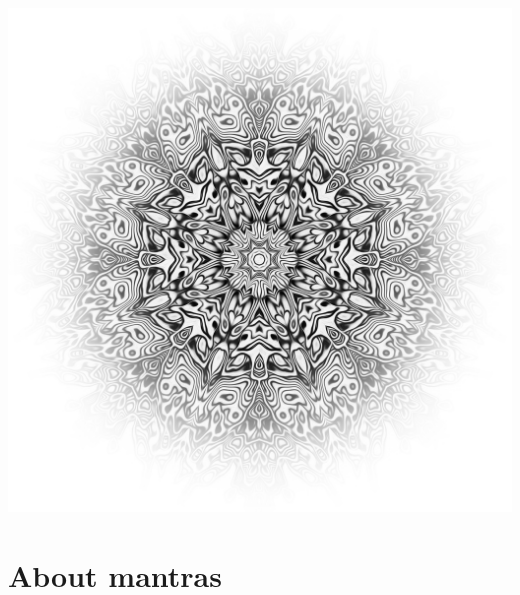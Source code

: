 \documentclass[twoside,10pt]{book}
\begin{document}
  \tableofcontents


  \begin{center}%
    \vspace*{\fill}%
    \includegraphics[width=1\textwidth]{shamanic_mandala_bw_ed_by_larva_CC0_1400px.jpg}
    \vspace*{\fill}%
  \end{center}

  \clearpage\scleardpage
     \section{About mantras}
       
     \clearpage\scleardpage
\end{document}
